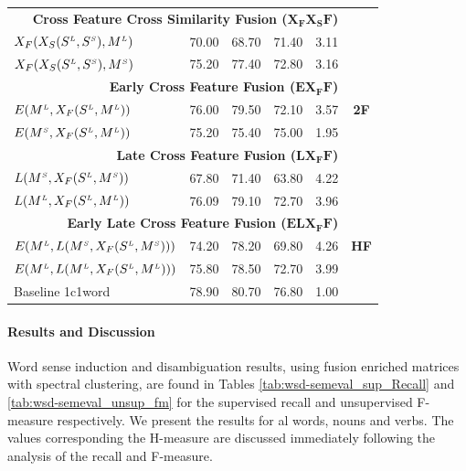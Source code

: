 \begin{table}[htp!]
\begin{tabular}{@{}lrrrrc@{}}
 \midrule
       \multicolumn{5}{r}{\textbf{Cross Feature Cross Similarity Fusion ($\mathbf{X_FX_SF}$)}}   & \multirow{9}{*}{\textbf{2F}}    \\ %

       $X_F(X_S(S^{\scriptscriptstyle L}, S^{\scriptscriptstyle S}), M^{\scriptscriptstyle L})$		&	70.00	&68.70  & 71.40& 3.11 \\	   
       $X_F(X_S(S^{\scriptscriptstyle L}, S^{\scriptscriptstyle S}), M^{\scriptscriptstyle S})$		&	75.20	& 77.40 & 72.80 & 3.16 \\	   
       \multicolumn{5}{r}{\textbf{Early Cross Feature Fusion ($\mathbf{EX_FF}$)}}       \\ %
       
       $E(M^{\scriptscriptstyle L}, X_F(S^{\scriptscriptstyle L}, M^{\scriptscriptstyle L}))$		&	76.00	& 79.50  & 72.10 & 3.57 \\	   
	   $E(M^{\scriptscriptstyle S}, X_F(S^{\scriptscriptstyle L}, M^{\scriptscriptstyle L}))$		&	75.20	&75.40  & 75.00 & 1.95 \\	   
       \multicolumn{5}{r}{\textbf{Late Cross Feature Fusion ($\mathbf{LX_FF}$)}}       \\ %
	   $L(M^{\scriptscriptstyle S}, X_F(S^{\scriptscriptstyle L}, M^{\scriptscriptstyle S}))$		&	67.80	& 71.40&63.80 & 4.22 \\	   
	   $L(M^{\scriptscriptstyle L}, X_F(S^{\scriptscriptstyle L}, M^{\scriptscriptstyle L}))$		&	76.09	&79.10 &72.70 & 3.96 \\	   
       \midrule
       \multicolumn{5}{r}{\textbf{Early Late Cross Feature Fusion ($\mathbf{ELX_FF	}$)}}    & \multirow{3}{*}{\textbf{HF}}   \\ %
	   $E(M^{\scriptscriptstyle L}, L(M^{\scriptscriptstyle S}, X_F(S^{\scriptscriptstyle L}, M^{\scriptscriptstyle S})))$		&	74.20	& 78.20 & 69.80& 4.26 \\	   
	   $E(M^{\scriptscriptstyle L}, L(M^{\scriptscriptstyle L}, X_F(S^{\scriptscriptstyle L}, M^{\scriptscriptstyle L})))$		&	75.80	& 78.50&72.70 & 3.99 \\
	   \midrule
	   \midrule
	   Baseline 1c1word 		&	78.90	& 80.70&76.80 & 1.00 \\ 	   	 	    	   

		   
       \bottomrule
\end{tabular}
\end{table}




\paragraph{Results and Discussion}
Word sense induction and disambiguation results, using fusion enriched matrices with spectral clustering, are found in Tables \ref{tab:wsd-semeval_sup_Recall} and \ref{tab:wsd-semeval_unsup_fm} for the supervised recall and unsupervised F-measure respectively. We present the results for al words, nouns and verbs. The values corresponding the H-measure are discussed immediately following the analysis of the recall and F-measure.

